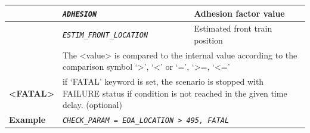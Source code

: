 \documentclass{template/openetcs}
\begin{document}
\begin{itemize}
\begin{longtable}{|l|l|l|}
			\hline
			
			&	\begin{minipage}[t]{0.40\linewidth} \emph{\texttt{ADHESION}} \end{minipage}
			&	\begin{minipage}[t]{0.38\linewidth} Adhesion factor value \end{minipage} \\
			
			\hline
			
			&	\begin{minipage}[t]{0.40\linewidth} \emph{\texttt{ESTIM\_FRONT\_LOCATION}} \end{minipage}
			&	\begin{minipage}[t]{0.38\linewidth} Estimated front train position \end{minipage} \\ 
			
			\hline	
			
			&	\multicolumn{2}{l|}{ \begin{minipage}[t]{0.78\linewidth} The <value> is compared to the internal value according to the comparison symbol ‘>’, ‘<’ or ‘=’, ‘>=, ‘<=’ \end{minipage} } \\
			
			\hline
			
				\begin{minipage}[t]{0.22\linewidth} \textbf{<FATAL>} \end{minipage}
			&	\multicolumn{2}{l|}{	\begin{minipage}[t]{0.78\linewidth} if ‘FATAL’ keyword is set, the scenario is stopped with FAILURE status if condition is not reached in the given time delay. (optional)	\end{minipage} } \\
			
			\hline
			
				\begin{minipage}[t]{0.22\linewidth} \textbf{Example} \end{minipage}
			&	\multicolumn{2}{l|}{ \begin{minipage}[t]{0.78\linewidth}	\emph{\texttt{CHECK\_PARAM = EOA\_LOCATION > 495, FATAL}} \end{minipage} } \\
			
			\hline\hline
			
		\end{longtable}
		

\end{itemize}
\end{document}
